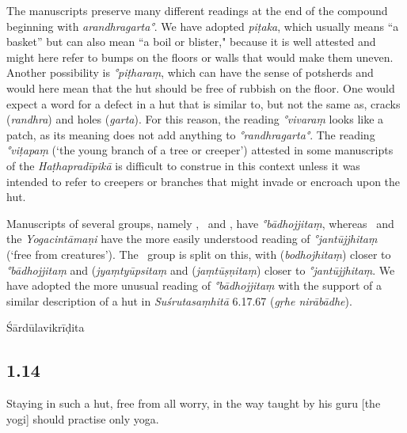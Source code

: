\begin{ekdosis}
\begin{philcomm}[hp01_013]
The manuscripts preserve many different readings at the end of the compound beginning with \emph{arandhragarta°}. We have adopted \emph{piṭaka}, which usually means ``a basket'' but can also mean ``a boil or blister," because it is well attested and might here refer to bumps on the floors or walls that would make them uneven. Another possibility is \emph{°piṭharaṃ}, which can have the sense of potsherds and would here mean that the hut should be free of rubbish on the floor. One would expect a word for a defect in a hut that is similar to, but not the same as, cracks (\emph{randhra}) and holes (\emph{garta}). For this reason, the reading \emph{°vivaraṃ} looks like a patch, as its meaning does not add anything to \emph{°randhragarta°}. The reading \emph{°viṭapaṃ} (`the young branch of a tree or creeper') attested in some manuscripts of the \emph{Haṭhapradīpikā} is difficult to construe in this context unless it was intended to refer to creepers or branches that might invade or encroach upon the hut.


Manuscripts of several groups, namely \textbeta, \textepsilon\ and \texteta, have \emph{°bādhojjitaṃ}, whereas \textdelta\ and the \emph{Yogacintāmaṇi} have the more easily understood reading of \emph{°jantūjjhitaṃ} (‘free from creatures’). The \textalpha\ group is split on this, with  (\emph{bodhojhitaṃ}) closer to \emph{°bādhojjitaṃ} and  (\emph{jyaṃtyūpsitaṃ} and  (\emph{jaṃtūṣṇitaṃ}) closer to \emph{°jantūjjhitaṃ}. We have adopted the more unusual reading of \emph{°bādhojjitaṃ}  with the support of a similar description of a hut in \emph{Suśrutasaṃhitā} 6.17.67 (\emph{gṛhe nirābādhe}). 

\end{philcomm}

\begin{metre}[hp01_013]
Śārdūlavikrīḍita
\end{metre}

\subsection*{1.14}
\begin{translation}[hp01_014]
Staying in such a hut, free from all worry, in the way taught by his guru [the yogi] should practise only yoga.
\end{translation}


\end{ekdosis}
